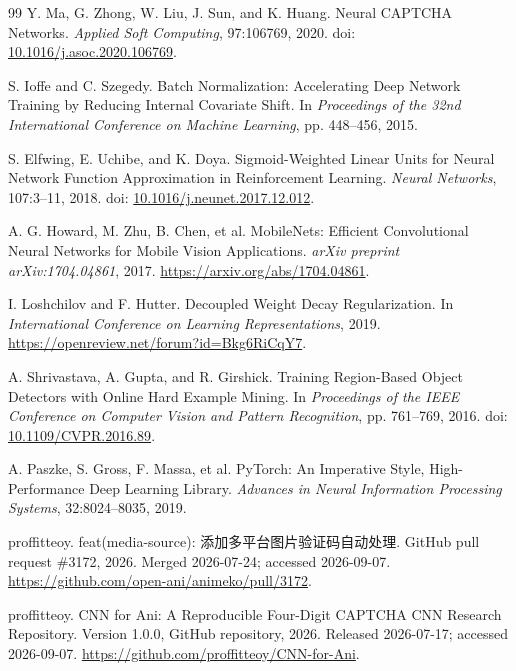 \documentclass[UTF8,12pt,a4paper]{ctexart}
\begin{document}
\begin{thebibliography}{99}
Y. Ma, G. Zhong, W. Liu, J. Sun, and K. Huang.
\newblock Neural CAPTCHA Networks.
\newblock \emph{Applied Soft Computing}, 97:106769, 2020.
\newblock doi: \href{https://doi.org/10.1016/j.asoc.2020.106769}{10.1016/j.asoc.2020.106769}.

S. Ioffe and C. Szegedy.
\newblock Batch Normalization: Accelerating Deep Network Training by Reducing Internal Covariate Shift.
\newblock In \emph{Proceedings of the 32nd International Conference on Machine Learning}, pp. 448--456, 2015.

S. Elfwing, E. Uchibe, and K. Doya.
\newblock Sigmoid-Weighted Linear Units for Neural Network Function Approximation in Reinforcement Learning.
\newblock \emph{Neural Networks}, 107:3--11, 2018.
\newblock doi: \href{https://doi.org/10.1016/j.neunet.2017.12.012}{10.1016/j.neunet.2017.12.012}.

A. G. Howard, M. Zhu, B. Chen, et al.
\newblock MobileNets: Efficient Convolutional Neural Networks for Mobile Vision Applications.
\newblock \emph{arXiv preprint arXiv:1704.04861}, 2017.
\newblock \url{https://arxiv.org/abs/1704.04861}.

I. Loshchilov and F. Hutter.
\newblock Decoupled Weight Decay Regularization.
\newblock In \emph{International Conference on Learning Representations}, 2019.
\newblock \url{https://openreview.net/forum?id=Bkg6RiCqY7}.

A. Shrivastava, A. Gupta, and R. Girshick.
\newblock Training Region-Based Object Detectors with Online Hard Example Mining.
\newblock In \emph{Proceedings of the IEEE Conference on Computer Vision and Pattern Recognition}, pp. 761--769, 2016.
\newblock doi: \href{https://doi.org/10.1109/CVPR.2016.89}{10.1109/CVPR.2016.89}.

A. Paszke, S. Gross, F. Massa, et al.
\newblock PyTorch: An Imperative Style, High-Performance Deep Learning Library.
\newblock \emph{Advances in Neural Information Processing Systems}, 32:8024--8035, 2019.

proffitteoy.
\newblock feat(media-source): 添加多平台图片验证码自动处理.
\newblock GitHub pull request \#3172, 2026. Merged 2026-07-24; accessed 2026-09-07.
\newblock \url{https://github.com/open-ani/animeko/pull/3172}.

proffitteoy.
\newblock CNN for Ani: A Reproducible Four-Digit CAPTCHA CNN Research Repository.
\newblock Version 1.0.0, GitHub repository, 2026. Released 2026-07-17; accessed 2026-09-07.
\newblock \url{https://github.com/proffitteoy/CNN-for-Ani}.

\end{thebibliography}
\end{document}
